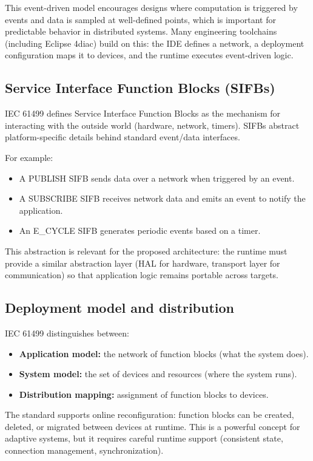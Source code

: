 This event-driven model encourages designs where computation is triggered by events and data is sampled at well-defined points, which is important for predictable behavior in distributed systems.
Many engineering toolchains (including Eclipse 4diac) build on this: the IDE defines a network, a deployment configuration maps it to devices, and the runtime executes event-driven logic.

\subsection{Service Interface Function Blocks (SIFBs)}

IEC 61499 defines Service Interface Function Blocks as the mechanism for interacting with the outside world (hardware, network, timers).
SIFBs abstract platform-specific details behind standard event/data interfaces.

For example:
\begin{itemize}
  \item A PUBLISH SIFB sends data over a network when triggered by an event.
  \item A SUBSCRIBE SIFB receives network data and emits an event to notify the application.
  \item An E\_CYCLE SIFB generates periodic events based on a timer.
\end{itemize}

This abstraction is relevant for the proposed architecture: the runtime must provide a similar abstraction layer (HAL for hardware, transport layer for communication) so that application logic remains portable across targets.

\subsection{Deployment model and distribution}

IEC 61499 distinguishes between:
\begin{itemize}
  \item \textbf{Application model:} the network of function blocks (what the system does).
  \item \textbf{System model:} the set of devices and resources (where the system runs).
  \item \textbf{Distribution mapping:} assignment of function blocks to devices.
\end{itemize}

The standard supports online reconfiguration: function blocks can be created, deleted, or migrated between devices at runtime.
This is a powerful concept for adaptive systems, but it requires careful runtime support (consistent state, connection management, synchronization).

